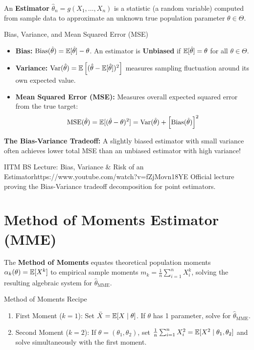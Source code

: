An \textbf{Estimator} $\hat{\theta}_n = g(X_1, \dots, X_n)$ is a statistic (a random variable) computed from sample data to approximate an unknown true population parameter $\theta \in \Theta$.

\begin{definitionbox}{Bias, Variance, and Mean Squared Error (MSE)}
\begin{itemize}
    \item \textbf{Bias:} $\operatorname{Bias}(\hat{\theta}) = \mathbb{E}[\hat{\theta}] - \theta$. An estimator is \textbf{Unbiased} if $\mathbb{E}[\hat{\theta}] = \theta$ for all $\theta \in \Theta$.
    \item \textbf{Variance:} $\operatorname{Var}(\hat{\theta}) = \mathbb{E}\left[(\hat{\theta} - \mathbb{E}[\hat{\theta}])^2\right]$ measures sampling fluctuation around its own expected value.
    \item \textbf{Mean Squared Error (MSE):} Measures overall expected squared error from the true target:
    $$\operatorname{MSE}(\hat{\theta}) = \mathbb{E}[(\hat{\theta} - \theta)^2] = \operatorname{Var}(\hat{\theta}) + \left[\operatorname{Bias}(\hat{\theta})\right]^2$$
\end{itemize}
\textbf{The Bias-Variance Tradeoff:} A slightly biased estimator with small variance often achieves lower total MSE than an unbiased estimator with high variance!
\end{definitionbox}

\begin{videocard}{IITM BS Lecture: Bias, Variance \& Risk of an Estimator}{https://www.youtube.com/watch?v=fZjMovn18YE}
Official lecture proving the Bias-Variance tradeoff decomposition for point estimators.
\end{videocard}

\section{Method of Moments Estimator (MME)}

The \textbf{Method of Moments} equates theoretical population moments $\alpha_k(\theta) = \mathbb{E}[X^k]$ to empirical sample moments $m_k = \frac{1}{n} \sum_{i=1}^n X_i^k$, solving the resulting algebraic system for $\hat{\theta}_{\text{MME}}$.

\begin{formulabox}{Method of Moments Recipe}
\begin{enumerate}
    \item First Moment ($k=1$): Set $\bar{X} = \mathbb{E}[X \mid \theta]$. If $\theta$ has 1 parameter, solve for $\hat{\theta}_{\text{MME}}$.
    \item Second Moment ($k=2$): If $\theta = (\theta_1, \theta_2)$, set $\frac{1}{n} \sum_{i=1}^n X_i^2 = \mathbb{E}[X^2 \mid \theta_1, \theta_2]$ and solve simultaneously with the first moment.
\end{enumerate}
\end{formulabox}

